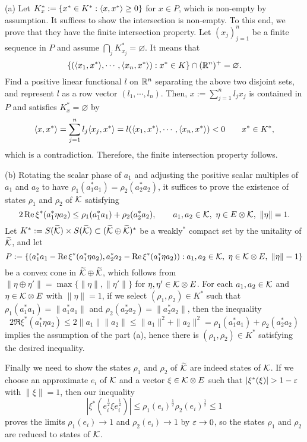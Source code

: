\documentclass{../../large}
\begin{document}
\begin{pf}
(a)
Let $K^*_x:=\{x^*\in K^*:\langle x,x^*\rangle\ge0\}$ for $x\in P$, which is non-empty by assumption.
It suffices to show the intersection is non-empty.
To this end, we prove that they have the finite intersection property.
Let $(x_j)_{j=1}^n$ be a finite sequence in $P$ and assume $\bigcap_jK^*_{x_j}=\varnothing$.
It means that
\[\{(\langle x_1,x^*\rangle,\cdots,\langle x_n,x^*\rangle):x^*\in K\}\cap(\mathbb{R}^n)^+=\varnothing.\]
Find a positive linear functional $l$ on $\mathbb{R}^n$ separating the above two disjoint sets, and represent $l$ as a row vector $(l_1,\cdots,l_n)$.
Then, $x:=\sum_{j=1}^nl_jx_j$ is contained in $P$ and satisfies $K^*_x=\varnothing$ by
\[\langle x,x^*\rangle=\sum_{j=1}^nl_j\langle x_j,x^*\rangle=l(\langle x_1,x^*\rangle,\cdots,\langle x_n,x^*\rangle)<0\qquad x^*\in K^*,\]
which is a contradiction.
Therefore, the finite intersection property follows.


(b)
Rotating the scalar phase of $a_1$ and adjusting the positive scalar multiples of $a_1$ and $a_2$ to have $\rho_1(a_1^*a_1)=\rho_2(a_2^*a_2)$, it suffices to prove the existence of states $\rho_1$ and $\rho_2$ of $\mathcal{K}$ satisfying
\[2\operatorname{Re}\xi^*(a_1^*\eta a_2)\le\rho_1(a_1^*a_1)+\rho_2(a_2^*a_2),\qquad a_1,a_2\in\mathcal{K},\ \eta\in E\otimes\mathcal{K},\ \|\eta\|=1.\]
Let $K^*:=S(\widetilde{\mathcal{K}})\times S(\widetilde{\mathcal{K}})\subset(\widetilde{\mathcal{K}}\oplus\widetilde{\mathcal{K}})^*$ be a weakly$^*$ compact set by the unitality of $\widetilde{\mathcal{K}}$, and let
\[P:=\{(a_1^*a_1-\operatorname{Re}\xi^*(a_1^*\eta a_2),a_2^*a_2-\operatorname{Re}\xi^*(a_1^*\eta a_2)):a_1,a_2\in\mathcal{K},\ \eta\in\mathcal{K}\otimes E,\ \|\eta\|=1\}\]
be a convex cone in $\widetilde{\mathcal{K}}\oplus\widetilde{\mathcal{K}}$, which follows from $\|\eta\oplus\eta'\|=\max\{\|\eta\|,\|\eta'\|\}$ for $\eta,\eta'\in\mathcal{K}\otimes E$.
For each $a_1,a_2\in\mathcal{K}$ and $\eta\in\mathcal{K}\otimes E$ with $\|\eta\|=1$, if we select $(\rho_1,\rho_2)\in K^*$ such that $\rho_1(a_1^*a_1)=\|a_1^*a_1\|$ and $\rho_2(a_2^*a_2)=\|a_2^*a_2\|$, then the inequality
\[2\Re\xi^*(a_1^*\eta a_2)\le2\|a_1\|\|a_2\|\le\|a_1\|^2+\|a_2\|^2=\rho_1(a_1^*a_1)+\rho_2(a_2^*a_2)\]
implies the assumption of the part (a), hence there is $(\rho_1,\rho_2)\in K^*$ satisfying the desired inequality.

Finally we need to show the states $\rho_1$ and $\rho_2$ of $\widetilde{\mathcal{K}}$ are indeed states of $\mathcal{K}$.
If we choose an approximate $e_i$ of $\mathcal{K}$ and a vector $\xi\in\mathcal{K}\otimes E$ such that $|\xi^*(\xi)|>1-\e$ with $\|\xi\|=1$, then our inequality
\[|\xi^*(e_i^{\frac12}\xi e_i^{\frac12})|\le\rho_1(e_i)^{\frac12}\rho_2(e_i)^{\frac12}\le1\]
proves the limits $\rho_1(e_i)\to1$ and $\rho_2(e_i)\to1$ by $\varepsilon\to0$, so the states $\rho_1$ and $\rho_2$ are reduced to states of $\mathcal{K}$.


\end{pf}
\end{document}
